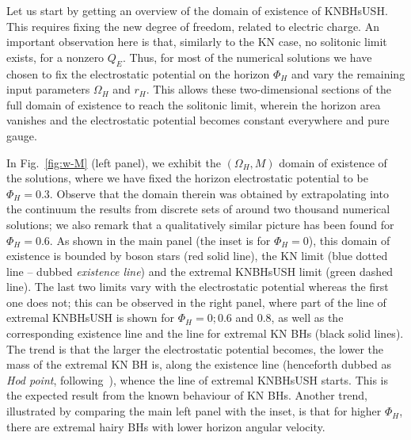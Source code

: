 \documentclass{article}
\begin{document}
Let us start by getting an overview of the domain of existence of KNBHsUSH. 
This requires fixing the new degree of freedom, related to electric charge. 
An important observation here is that, similarly to the
KN case, no solitonic limit exists, for a nonzero $Q_E$.
Thus, for most of the numerical solutions we have chosen to fix the electrostatic potential on the horizon $\Phi_H$
and vary the remaining  input parameters $\Omega_H$ and $r_H$.
This allows these  two-dimensional sections of the full domain of existence to reach the solitonic limit, 
wherein the horizon area vanishes and the electrostatic potential becomes constant everywhere and pure gauge.


 In Fig.~\ref{fig:w-M} (left panel), 
we exhibit the $(\Omega_H,M)$ domain of existence of the solutions, where we have fixed the horizon electrostatic potential to be $\Phi_H=0.3$. Observe that the domain therein was obtained by extrapolating into the continuum
the results from discrete sets of around two thousand numerical solutions; we also remark that a qualitatively similar picture has been found for $\Phi_H=0.6$.
 As shown in the main panel (the inset is for $\Phi_H=0$), 
this domain of existence is bounded by boson stars (red solid line), 
the KN limit (blue dotted line -- dubbed \textit{existence line}) 
and the extremal KNBHsUSH limit (green dashed line). 
The last two limits vary with the electrostatic potential whereas the first one does not; 
this can be observed in the right panel, where part of the line of extremal KNBHsUSH is shown for $\Phi_H=0; 0.6$ and $0.8$, as well as the corresponding existence line and the line for extremal KN BHs (black solid lines). 
The trend is that the larger the electrostatic potential becomes, the lower the mass of the extremal KN BH is, along the existence line (henceforth dubbed as \textit{Hod point}, following~\cite{Herdeiro:2015tia}), whence the line of extremal KNBHsUSH starts. This is the expected result from the known behaviour of KN BHs. Another trend, illustrated by comparing the main left panel with the inset, is that for higher $\Phi_H$, there are extremal hairy BHs with lower horizon angular velocity.
\end{document}
